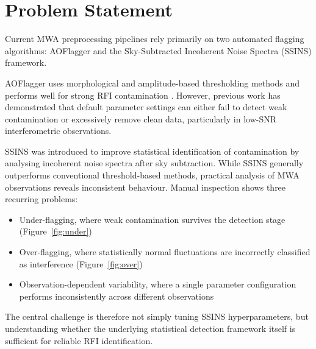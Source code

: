 \documentclass{article}
\begin{document}

\section{Problem Statement}

Current MWA preprocessing pipelines rely primarily on two automated flagging algorithms: AOFlagger and the Sky-Subtracted Incoherent Noise Spectra (SSINS) framework.

AOFlagger uses morphological and amplitude-based thresholding methods and performs well for strong RFI contamination \citep{Offringa2010}. However, previous work has demonstrated that default parameter settings can either fail to detect weak contamination or excessively remove clean data, particularly in low-SNR interferometric observations.

SSINS was introduced to improve statistical identification of contamination by analysing incoherent noise spectra after sky subtraction. While SSINS generally outperforms conventional threshold-based methods, practical analysis of MWA observations reveals inconsistent behaviour. Manual inspection shows three recurring problems:

\begin{itemize}
 \item Under-flagging, where weak contamination survives the detection stage (Figure~\ref{fig:under})
\item Over-flagging, where statistically normal fluctuations are incorrectly classified as interference (Figure~\ref{fig:over})
\item Observation-dependent variability, where a single parameter configuration performs inconsistently across different observations
\end{itemize}

The central challenge is therefore not simply tuning SSINS hyperparameters, but understanding whether the underlying statistical detection framework itself is sufficient for reliable RFI identification.
\end{document}
